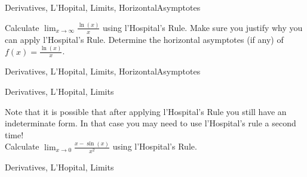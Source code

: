 
\begin{tagblock}{Derivatives, L'Hopital, Limits, HorizontalAsymptotes }

\begin{question}

Calculate  $\displaystyle  \lim_{x \to \infty} \frac{\ln(x)}{x}$ using l'Hospital's Rule.   Make sure you justify why you can apply  l'Hospital's Rule.   Determine the horizontal asymptotes (if any) of $ \displaystyle f(x) =   \frac{\ln(x)}{x}$.


	
\begin{tags}
	   Derivatives, L'Hopital, Limits, HorizontalAsymptotes 

\end{tags}
	
\begin{diary}
\end{diary}
	
\begin{solution}
	   
\end{solution}
	
\end{question}

\end{tagblock}


\begin{tagblock}{Derivatives, L'Hopital, Limits}

\begin{question}

Note that it is possible that after applying l'Hospital's Rule you still have an indeterminate form.  In that case you may need to use l'Hospital's rule a second time!  \\
 Calculate $\displaystyle \lim_{x\to 0}\frac{x-\sin(x)}{x^2}$ using l'Hospital's Rule.


	
\begin{tags}
	   Derivatives, L'Hopital, Limits

\end{tags}
	
\begin{diary}
\end{diary}
	
\begin{solution}
	   
\end{solution}
	
\end{question}

\end{tagblock}


